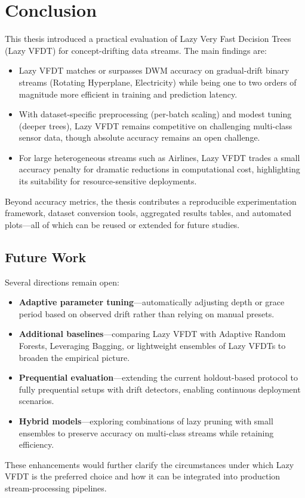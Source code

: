 \cleardoublepage
\chapter{Conclusion}
\label{chap:conclusion}

This thesis introduced a practical evaluation of Lazy Very Fast Decision Trees (Lazy VFDT) for concept-drifting data streams. The main findings are:
\begin{itemize}
    \item Lazy VFDT matches or surpasses DWM accuracy on gradual-drift binary streams (Rotating Hyperplane, Electricity) while being one to two orders of magnitude more efficient in training and prediction latency.
    \item With dataset-specific preprocessing (per-batch scaling) and modest tuning (deeper trees), Lazy VFDT remains competitive on challenging multi-class sensor data, though absolute accuracy remains an open challenge.
    \item For large heterogeneous streams such as Airlines, Lazy VFDT trades a small accuracy penalty for dramatic reductions in computational cost, highlighting its suitability for resource-sensitive deployments.
\end{itemize}

Beyond accuracy metrics, the thesis contributes a reproducible experimentation framework, dataset conversion tools, aggregated results tables, and automated plots---all of which can be reused or extended for future studies.

\section{Future Work}
Several directions remain open:
\begin{itemize}
    \item \textbf{Adaptive parameter tuning}---automatically adjusting depth or grace period based on observed drift rather than relying on manual presets.
    \item \textbf{Additional baselines}---comparing Lazy VFDT with Adaptive Random Forests, Leveraging Bagging, or lightweight ensembles of Lazy VFDTs to broaden the empirical picture.
    \item \textbf{Prequential evaluation}---extending the current holdout-based protocol to fully prequential setups with drift detectors, enabling continuous deployment scenarios.
    \item \textbf{Hybrid models}---exploring combinations of lazy pruning with small ensembles to preserve accuracy on multi-class streams while retaining efficiency.
\end{itemize}

These enhancements would further clarify the circumstances under which Lazy VFDT is the preferred choice and how it can be integrated into production stream-processing pipelines.
